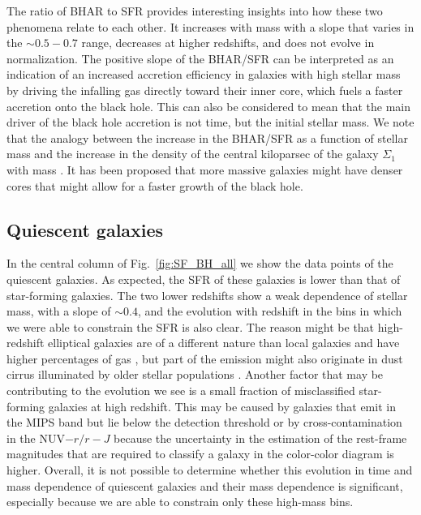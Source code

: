 The ratio of BHAR to SFR provides interesting insights into how these two phenomena relate to each other. It increases with mass with a slope that varies in the $\sim0.5-0.7$ range, decreases at higher redshifts, and does not evolve in normalization. 
The positive slope of the BHAR/SFR can be interpreted as 
an indication of
an increased accretion efficiency in galaxies with high stellar mass by driving the infalling gas directly toward their inner core, which fuels a faster accretion onto the black hole. This can also be considered to mean that the main driver of the black hole accretion is not time, but the initial stellar mass. 
We note that the analogy between the increase in the BHAR/SFR as a function of stellar mass and the increase in the density of the central kiloparsec of the galaxy $\Sigma_1$ with mass \citep{2013ApJ...776...63F,2017ApJ...840...47B}. It has been proposed that more massive galaxies might have denser cores that might allow for a faster growth of the black hole.


\subsection{Quiescent galaxies}
In the central column of Fig.~\ref{fig:SF_BH_all} we show the data points of the quiescent galaxies. As expected, the SFR of these galaxies is lower than that of star-forming galaxies.
The two lower redshifts show a weak dependence of stellar mass, with a slope of $\sim0.4$, 
and the evolution with redshift in the bins in which we were able to constrain the SFR is also clear.
The reason might be that high-redshift elliptical galaxies are of a different nature than local galaxies and have higher percentages of gas \citep{2018NatAs...2..239G}, but part of the emission might also originate in dust cirrus illuminated by older stellar populations \citep{2007ApJ...657..810D, 2015A&A...573A.113B}. 
Another factor that may be contributing to the evolution we see is a small fraction of misclassified star-forming galaxies at high redshift. This may be caused by galaxies that emit in the MIPS band but lie below the detection threshold or by cross-contamination in the NUV$ - r / r - J$ because the uncertainty in the estimation of the rest-frame magnitudes that are required to classify a galaxy in the color-color diagram is higher. Overall, it is not possible to determine whether this evolution in time and mass dependence of quiescent galaxies and their mass dependence is significant, especially because we are able to constrain only these high-mass bins.

